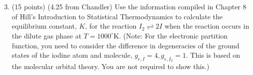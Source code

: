 \documentclass[12pt]{article}
\begin{document}
\section{}
\begin{enumerate}
  \setcounter{enumi}{2}
  \item (15 points) (4.25 from Chandler) Use the information compiled in Chapter 8 of Hill's Introduction to Statistical Thermodynamics to calculate the equilibrium constant, $K$, for the reaction $I_{2} \rightleftharpoons 2 I$ when the reaction occurs in the dilute gas phase at $T=1000^{\circ} \mathrm{K}$. (Note: For the electronic partition function, you need to consider the difference in degeneracies of the ground states of the iodine atom and molecule, $g_{e, I}=4, g_{e, I_{2}}=1$. This is based on the molecular orbital theory. You are not required to show this.)

\end{enumerate}
\end{document}
